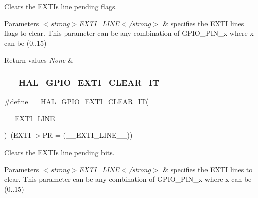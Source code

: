 Clears the E\+X\+TI\textquotesingle{}s line pending flags. 


\begin{DoxyParams}{Parameters}
{\em $<$strong$>$\+E\+X\+T\+I\+\_\+\+L\+I\+N\+E$<$/strong$>$} & specifies the E\+X\+TI lines flags to clear. This parameter can be any combination of G\+P\+I\+O\+\_\+\+P\+I\+N\+\_\+x where x can be (0..15) \\
\hline
\end{DoxyParams}

\begin{DoxyRetVals}{Return values}
{\em None} & \\
\hline
\end{DoxyRetVals}
\mbox{\label{group___g_p_i_o___exported___macros_ga2a086506eec826f49b200fba64beb9f1}} 
\subsubsection{\texorpdfstring{\+\_\+\+\_\+\+H\+A\+L\+\_\+\+G\+P\+I\+O\+\_\+\+E\+X\+T\+I\+\_\+\+C\+L\+E\+A\+R\+\_\+\+IT}{\_\_HAL\_GPIO\_EXTI\_CLEAR\_IT}}
{\footnotesize\ttfamily \#define \+\_\+\+\_\+\+H\+A\+L\+\_\+\+G\+P\+I\+O\+\_\+\+E\+X\+T\+I\+\_\+\+C\+L\+E\+A\+R\+\_\+\+IT(\begin{DoxyParamCaption}\item[{}]{\+\_\+\+\_\+\+E\+X\+T\+I\+\_\+\+L\+I\+N\+E\+\_\+\+\_\+ }\end{DoxyParamCaption})~(E\+X\+TI-\/$>$PR = (\+\_\+\+\_\+\+E\+X\+T\+I\+\_\+\+L\+I\+N\+E\+\_\+\+\_\+))}



Clears the E\+X\+TI\textquotesingle{}s line pending bits. 


\begin{DoxyParams}{Parameters}
{\em $<$strong$>$\+E\+X\+T\+I\+\_\+\+L\+I\+N\+E$<$/strong$>$} & specifies the E\+X\+TI lines to clear. This parameter can be any combination of G\+P\+I\+O\+\_\+\+P\+I\+N\+\_\+x where x can be (0..15) \\
\hline
\end{DoxyParams}

